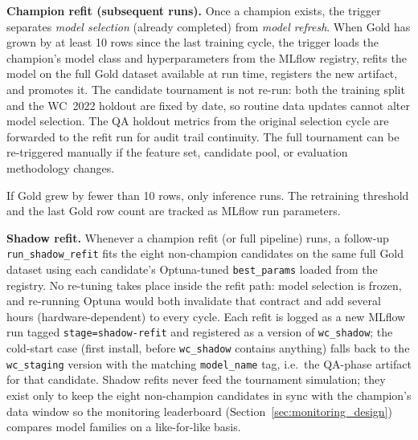 \documentclass[conference]{IEEEtran}
\begin{document}
\textbf{Champion refit (subsequent runs).}
Once a champion exists, the trigger separates \emph{model selection}
(already completed) from \emph{model refresh}.  When Gold has grown by at
least 10 rows since the last training cycle, the trigger loads the
champion's model class and hyperparameters from the MLflow registry, refits
the model on the full Gold dataset available at run time, registers the
new artifact, and promotes it.  The candidate tournament is not re-run:
both the training split and the WC~2022 holdout are fixed by date, so
routine data updates cannot alter model selection.  The QA holdout metrics
from the original selection cycle are forwarded to the refit run for audit
trail continuity.  The full tournament can be re-triggered manually if the
feature set, candidate pool, or evaluation methodology changes.

If Gold grew by fewer than 10 rows, only inference runs.  The retraining
threshold and the last Gold row count are tracked as MLflow run parameters.

\textbf{Shadow refit.}
Whenever a champion refit (or full pipeline) runs, a follow-up
\texttt{run\_shadow\_refit} fits the eight non-champion candidates on the
same full Gold dataset using each candidate's Optuna-tuned
\texttt{best\_params} loaded from the registry. No re-tuning takes place
inside the refit path: model selection is frozen, and re-running
Optuna would both invalidate that contract and add several hours (hardware-dependent)
to every cycle. Each refit is logged as a new MLflow run tagged
\texttt{stage=shadow-refit} and registered as a version of
\texttt{wc\_shadow}; the cold-start case (first install, before
\texttt{wc\_shadow} contains anything) falls back to the
\texttt{wc\_staging} version with the matching \texttt{model\_name} tag,
i.e.\ the QA-phase artifact for that candidate. Shadow refits never feed
the tournament simulation; they exist only to keep the eight
non-champion candidates in sync with the champion's data window so the
monitoring leaderboard (Section~\ref{sec:monitoring_design}) compares
model families on a like-for-like basis.
\end{document}
